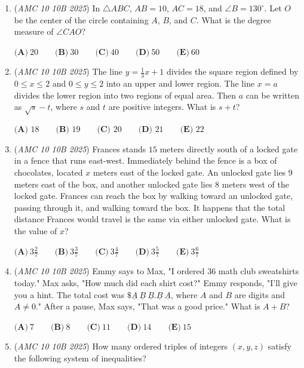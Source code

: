 \begin{enumerate}
	\item (\textit{AMC 10 10B 2025}) In $\triangle ABC$, $AB=10$, $AC=18$, and $\angle B=130^\circ.$ Let $O$ be the center of the circle containing $A$, $B$, and $C.$ What is the degree measure of $\angle CAO$?


 $\textbf{(A)}~20 \qquad \textbf{(B)}~30 \qquad \textbf{(C)}~40 \qquad \textbf{(D)}~50 \qquad \textbf{(E)}~60$


	\item (\textit{AMC 10 10B 2025}) The line $y = \frac{1}{3}x + 1$ divides the square region defined by $0 \leq x \leq 2$ and $0 \leq y \leq 2$ into an upper and lower region. The line $x=a$ divides the lower region into two regions of equal area. Then $a$ can be written as $\sqrt{s} - t$, where $s$ and $t$ are positive integers. What is $s+t$?


 $\textbf{(A) } 18 \qquad\textbf{(B) } 19 \qquad\textbf{(C) }20\qquad\textbf{(D) } 21 \qquad\textbf{(E) } 22$


	\item (\textit{AMC 10 10B 2025}) Frances stands $15$ meters directly south of a locked gate in a fence that runs east-west. Immediately behind the fence is a box of chocolates, located $x$ meters east of the locked gate. An unlocked gate lies $9$ meters east of the box, and another unlocked gate lies $8$ meters west of the locked gate. Frances can reach the box by walking toward an unlocked gate, passing through it, and walking toward the box. It happens that the total distance Frances would travel is the same via either unlocked gate. What is the value of $x$?


 $\textbf{(A)}~3\frac27 \qquad \textbf{(B)}~3\frac37 \qquad \textbf{(C)}~3\frac47 \qquad \textbf{(D)}~3\frac57 \qquad \textbf{(E)}~3\frac67$


	\item (\textit{AMC 10 10B 2025}) Emmy says to Max, "I ordered $36$ math club sweatshirts today." Max asks, "How much did each shirt cost?" Emmy responds, "I'll give you a hint. The total cost was $\$ \underline A~\underline B~\underline B.\underline B~\underline A$, where $A$ and $B$ are digits and $A \neq 0$." After a pause, Max says, "That was a good price." What is $A + B$?


 $\textbf{(A)}~7 \qquad \textbf{(B)}~8 \qquad \textbf{(C)}~11 \qquad \textbf{(D)}~14 \qquad \textbf{(E)}~15$


	\item (\textit{AMC 10 10B 2025}) How many ordered triples of integers $(x, y, z)$ satisfy the following system of inequalities?



\end{enumerate}
